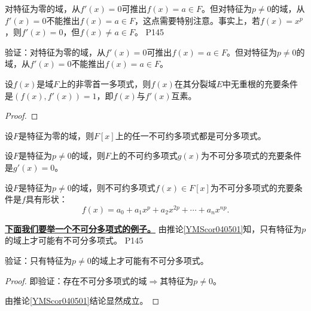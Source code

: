 \original
{
	对特征为零的域，从$f'(x)=0$可推出$f(x)=a\in F$。但对特征为$p\neq 0$的域，从$f'(x)=0$不能推出$f(x)=a\in F$，这点需要特别注意。事实上，若$f(x)=x^{p}$，则$f'(x)=0$，但$f(x)\neq a\in F$。
}
{P145}

\begin{proposition}
	验证：对特征为零的域，从$f'(x)=0$可推出$f(x)=a\in F$。但对特征为$p\neq 0$的域，从$f'(x)=0$不能推出$f(x)=a\in F$。
\end{proposition}

\begin{theorem}
	设$f(x)$是域$F$上的非零首一多项式，则$f(x)$在其分裂域$E$中无重根的充要条件是$(f(x),f'(x))=1$，即$f(x)$与$f'(x)$互素。
\end{theorem}

\begin{proof}
	
\end{proof}


\begin{corollary}\label{YMScor040501}
	设$F$是特征为零的域，则$F[x]$上的任一不可约多项式都是可分多项式。	
\end{corollary}


\begin{corollary}
	设$F$是特征为$p\neq 0$的域，则$F$上的不可约多项式$g(x)$为不可分多项式的充要条件是$g'(x)=0$。	
\end{corollary}


\begin{corollary}
	设$F$是特征为$p\neq 0$的域，则不可约多项式$f(x)\in F[x] $为不可分多项式的充要条件是$f$具有形状：
	\begin{equation*}
		f(x)=a_{0}+a_{1}x^{p}+a_{2}x^{2p}+\cdots +a_{n}x^{np}.
	\end{equation*}
\end{corollary}
	
\original
{
	\textbf{\uline{下面我们要举一个不可分多项式的例子。} }由推论\ref{YMScor040501}知，只有特征为$p$的域上才可能有不可分多项式。
}
{P145}

\begin{proposition}
	验证：只有特征为$p\neq 0$的域上才可能有不可分多项式。
\end{proposition}

\begin{proof}
	即验证：存在不可分多项式的域$\Rightarrow$其特征为$p\neq 0 $。
	\par
	由推论\ref{YMScor040501}结论显然成立。
\end{proof}

